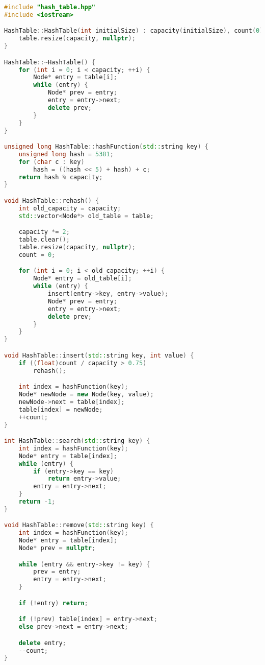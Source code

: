 \documentclass{article}
\begin{document}
\begin{lstlisting}[language=C++]
#include "hash_table.hpp"
#include <iostream>

HashTable::HashTable(int initialSize) : capacity(initialSize), count(0) {
    table.resize(capacity, nullptr);
}

HashTable::~HashTable() {
    for (int i = 0; i < capacity; ++i) {
        Node* entry = table[i];
        while (entry) {
            Node* prev = entry;
            entry = entry->next;
            delete prev;
        }
    }
}

unsigned long HashTable::hashFunction(std::string key) {
    unsigned long hash = 5381;
    for (char c : key)
        hash = ((hash << 5) + hash) + c;
    return hash % capacity;
}

void HashTable::rehash() {
    int old_capacity = capacity;
    std::vector<Node*> old_table = table;

    capacity *= 2;
    table.clear();
    table.resize(capacity, nullptr);
    count = 0;

    for (int i = 0; i < old_capacity; ++i) {
        Node* entry = old_table[i];
        while (entry) {
            insert(entry->key, entry->value);
            Node* prev = entry;
            entry = entry->next;
            delete prev;
        }
    }
}

void HashTable::insert(std::string key, int value) {
    if ((float)count / capacity > 0.75)
        rehash();

    int index = hashFunction(key);
    Node* newNode = new Node(key, value);
    newNode->next = table[index];
    table[index] = newNode;
    ++count;
}

int HashTable::search(std::string key) {
    int index = hashFunction(key);
    Node* entry = table[index];
    while (entry) {
        if (entry->key == key)
            return entry->value;
        entry = entry->next;
    }
    return -1;
}

void HashTable::remove(std::string key) {
    int index = hashFunction(key);
    Node* entry = table[index];
    Node* prev = nullptr;

    while (entry && entry->key != key) {
        prev = entry;
        entry = entry->next;
    }

    if (!entry) return;

    if (!prev) table[index] = entry->next;
    else prev->next = entry->next;

    delete entry;
    --count;
}
\end{lstlisting}
\end{document}
